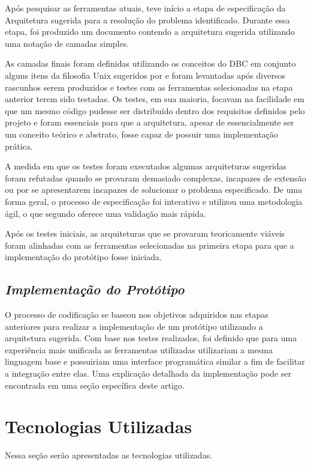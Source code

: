 Após pesquisar as ferramentas atuais, teve início a etapa de especificação da Arquitetura sugerida para a resolução do problema identificado. Durante essa etapa, foi produzido um documento contendo a arquitetura sugerida utilizando uma notação de camadas simples.

As camadas finais foram definidas utilizando os conceitos do DBC em conjunto alguns itens da filosofia Unix sugeridos por \cite{unixPhilosophy} e foram levantadas após diversos rascunhos serem produzidos e testes com as ferramentas selecionadas na etapa anterior terem sido testadas. Os testes, em sua maioria, focavam na facilidade em que um mesmo código pudesse ser distribuído dentro dos requisitos definidos pelo projeto e foram essenciais para que a arquitetura, apesar de essencialmente ser um conceito teórico e abstrato, fosse capaz de possuir uma implementação prática. 

A medida em que os testes foram executados algumas arquiteturas sugeridas foram refutadas quando se provaram demasiado complexas, incapazes de extensão ou por se apresentarem incapazes de solucionar o problema especificado. De uma forma geral, o processo de especificação foi interativo e utilizou uma metodologia ágil, o que segundo \cite{pressman2011} oferece uma validação mais rápida.

Após os testes iniciais, as arquiteturas que se provaram teoricamente viáveis foram alinhadas com as ferramentas selecionadas na primeira etapa para que a implementação do protótipo fosse iniciada.

\subsection{{\it Implementação do Protótipo}}

O processo de codificação se baseou nos objetivos adquiridos nas etapas anteriores para realizar a implementação de um protótipo utilizando a arquitetura sugerida. Com base nos testes realizados, foi definido que para uma experiência mais unificada as ferramentas utilizadas utilizariam a mesma linguagem base e possuiriam uma interface programática similar a fim de facilitar a integração entre elas. Uma explicação detalhada da implementação pode ser encontrada em uma seção específica deste artigo.

\section{\esp Tecnologias Utilizadas}
Nessa seção serão apresentadas as tecnologias utilizadas.

